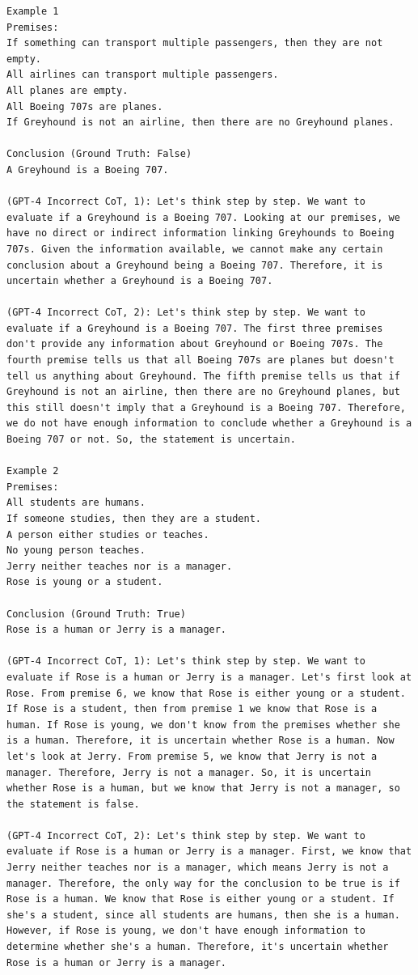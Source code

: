 \begin{lstlisting}[breaklines=true]
Example 1
Premises:
If something can transport multiple passengers, then they are not empty.
All airlines can transport multiple passengers.
All planes are empty.
All Boeing 707s are planes.
If Greyhound is not an airline, then there are no Greyhound planes.

Conclusion (Ground Truth: False)
A Greyhound is a Boeing 707.

(GPT-4 Incorrect CoT, 1): Let's think step by step. We want to evaluate if a Greyhound is a Boeing 707. Looking at our premises, we have no direct or indirect information linking Greyhounds to Boeing 707s. Given the information available, we cannot make any certain conclusion about a Greyhound being a Boeing 707. Therefore, it is uncertain whether a Greyhound is a Boeing 707.

(GPT-4 Incorrect CoT, 2): Let's think step by step. We want to evaluate if a Greyhound is a Boeing 707. The first three premises don't provide any information about Greyhound or Boeing 707s. The fourth premise tells us that all Boeing 707s are planes but doesn't tell us anything about Greyhound. The fifth premise tells us that if Greyhound is not an airline, then there are no Greyhound planes, but this still doesn't imply that a Greyhound is a Boeing 707. Therefore, we do not have enough information to conclude whether a Greyhound is a Boeing 707 or not. So, the statement is uncertain.

Example 2
Premises:
All students are humans.
If someone studies, then they are a student.
A person either studies or teaches.
No young person teaches.
Jerry neither teaches nor is a manager.
Rose is young or a student.

Conclusion (Ground Truth: True)
Rose is a human or Jerry is a manager.

(GPT-4 Incorrect CoT, 1): Let's think step by step. We want to evaluate if Rose is a human or Jerry is a manager. Let's first look at Rose. From premise 6, we know that Rose is either young or a student. If Rose is a student, then from premise 1 we know that Rose is a human. If Rose is young, we don't know from the premises whether she is a human. Therefore, it is uncertain whether Rose is a human. Now let's look at Jerry. From premise 5, we know that Jerry is not a manager. Therefore, Jerry is not a manager. So, it is uncertain whether Rose is a human, but we know that Jerry is not a manager, so the statement is false.

(GPT-4 Incorrect CoT, 2): Let's think step by step. We want to evaluate if Rose is a human or Jerry is a manager. First, we know that Jerry neither teaches nor is a manager, which means Jerry is not a manager. Therefore, the only way for the conclusion to be true is if Rose is a human. We know that Rose is either young or a student. If she's a student, since all students are humans, then she is a human. However, if Rose is young, we don't have enough information to determine whether she's a human. Therefore, it's uncertain whether Rose is a human or Jerry is a manager.
\end{lstlisting}


